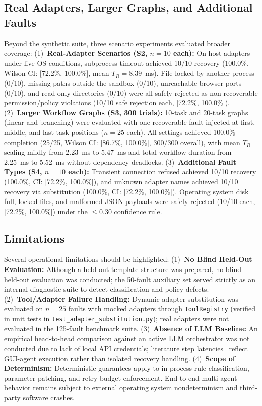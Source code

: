 \documentclass[conference]{IEEEtran}
\newcommand{\chg}[1]{{\color{blue}#1}}
\begin{document}
\subsection{\chg{Real Adapters, Larger Graphs, and Additional Faults}}
\chg{Beyond the synthetic suite, three scenario experiments evaluated broader coverage:
(1)~\textbf{Real-Adapter Scenarios (S2, $n=10$ each):} On host adapters under live OS conditions, subprocess timeout achieved 10/10 recovery (100.0\%, Wilson CI: [72.2\%, 100.0\%], mean $T_R = 8.39$~ms). File locked by another process (0/10), missing paths outside the sandbox (0/10), unreachable browser ports (0/10), and read-only directories (0/10) were all safely rejected as non-recoverable permission/policy violations (10/10 safe rejection each, [72.2\%, 100.0\%]).
(2)~\textbf{Larger Workflow Graphs (S3, 300 trials):} 10-task and 20-task graphs (linear and branching) were evaluated with one recoverable fault injected at first, middle, and last task positions ($n=25$ each). All settings achieved 100.0\% completion (25/25, Wilson CI: [86.7\%, 100.0\%], 300/300 overall), with mean $T_R$ scaling mildly from 2.23~ms to 5.47~ms and total workflow duration from 2.25~ms to 5.52~ms without dependency deadlocks.
(3)~\textbf{Additional Fault Types (S4, $n=10$ each):} Transient connection refused achieved 10/10 recovery (100.0\%, CI: [72.2\%, 100.0\%]), and unknown adapter names achieved 10/10 recovery via substitution (100.0\%, CI: [72.2\%, 100.0\%]). Operating system disk full, locked files, and malformed JSON payloads were safely rejected (10/10 each, [72.2\%, 100.0\%]) under the $\le 0.30$ confidence rule.}

\subsection{Limitations}
Several operational limitations should be highlighted:
\chg{(1)~\textbf{No Blind Held-Out Evaluation:} Although a held-out template structure was prepared, no blind held-out evaluation was conducted; the 50-fault auxiliary set served strictly as an internal diagnostic suite to detect classification and policy defects.}
\chg{(2)~\textbf{Tool/Adapter Failure Handling:} Dynamic adapter substitution was evaluated on $n=25$ faults with mocked adapters through \texttt{ToolRegistry} (verified in unit tests in \texttt{test\_adapter\_substitution.py}); real adapters were not evaluated in the 125-fault benchmark suite.}
\chg{(3)~\textbf{Absence of LLM Baseline:} An empirical head-to-head comparison against an active LLM orchestrator was not conducted due to lack of local API credentials; literature step latencies~\cite{wu2025} reflect GUI-agent execution rather than isolated recovery handling.}
(4)~\textbf{Scope of Determinism:} Deterministic guarantees apply to in-process rule classification, parameter patching, and retry budget enforcement. End-to-end multi-agent behavior remains subject to external operating system nondeterminism and third-party software crashes.
\end{document}
